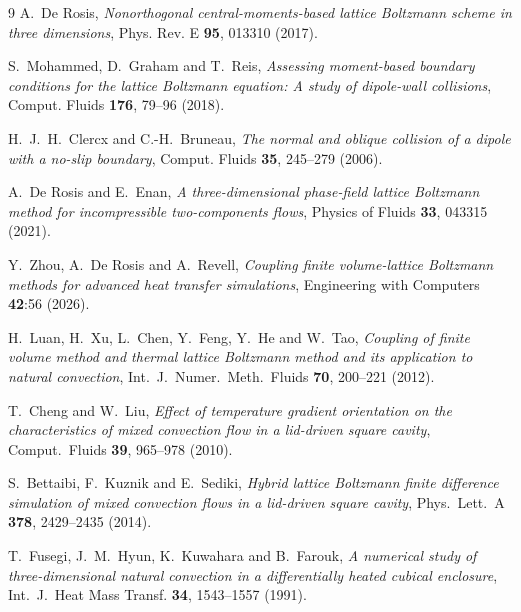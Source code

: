 \documentclass[11pt,a4paper]{article}
\begin{document}
\begin{thebibliography}{9}
 A.~De Rosis,
  \emph{Nonorthogonal central-moments-based lattice Boltzmann scheme in three
  dimensions}, Phys. Rev. E \textbf{95}, 013310 (2017).

 S.~Mohammed, D.~Graham and T.~Reis,
  \emph{Assessing moment-based boundary conditions for the lattice Boltzmann
  equation: A study of dipole-wall collisions},
  Comput. Fluids \textbf{176}, 79--96 (2018).

 H.~J.~H.~Clercx and C.-H.~Bruneau,
  \emph{The normal and oblique collision of a dipole with a no-slip boundary},
  Comput. Fluids \textbf{35}, 245--279 (2006).

 A.~De Rosis and E.~Enan,
  \emph{A three-dimensional phase-field lattice Boltzmann method for
  incompressible two-components flows}, Physics of Fluids \textbf{33},
  043315 (2021).

 Y.~Zhou, A.~De Rosis and A.~Revell,
  \emph{Coupling finite volume-lattice Boltzmann methods for advanced heat
  transfer simulations}, Engineering with Computers \textbf{42}:56 (2026).

 H.~Luan, H.~Xu, L.~Chen, Y.~Feng, Y.~He and W.~Tao,
  \emph{Coupling of finite volume method and thermal lattice Boltzmann method
  and its application to natural convection},
  Int.~J.~Numer.~Meth.~Fluids \textbf{70}, 200--221 (2012).

 T.~Cheng and W.~Liu,
  \emph{Effect of temperature gradient orientation on the characteristics of
  mixed convection flow in a lid-driven square cavity},
  Comput.~Fluids \textbf{39}, 965--978 (2010).

 S.~Bettaibi, F.~Kuznik and E.~Sediki,
  \emph{Hybrid lattice Boltzmann finite difference simulation of mixed
  convection flows in a lid-driven square cavity},
  Phys.~Lett.~A \textbf{378}, 2429--2435 (2014).

 T.~Fusegi, J.~M.~Hyun, K.~Kuwahara and B.~Farouk,
  \emph{A numerical study of three-dimensional natural convection in a
  differentially heated cubical enclosure},
  Int.~J.~Heat Mass Transf. \textbf{34}, 1543--1557 (1991).

\end{thebibliography}
\end{document}
